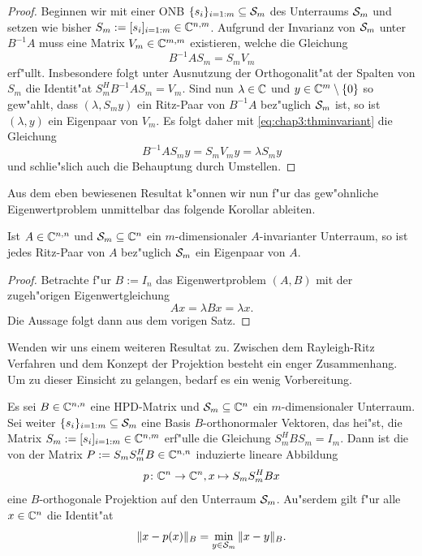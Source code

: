 \begin{proof}
Beginnen wir mit einer ONB $\{s_i\}_{i=1:m}\subseteq\S_m$ des Unterraums $\S_m$
und setzen wie bisher $S_m := [s_i]_{i=1:m}\in\C^{n,m}$. Aufgrund der Invarianz
von $\S_m$ unter $B^{-1}A$ muss eine Matrix $V_m \in \C^{m,m}$ existieren, welche
die Gleichung
\begin{equation}\label{eq:chap3:thminvariant}
B^{-1}A S_m = S_m V_m
\end{equation}
erf"ullt. Insbesondere folgt unter Ausnutzung der Orthogonalit"at der Spalten
von $S_m$ die Identit"at $S_m^H B^{-1}A S_m = V_m$.
Sind nun $\lambda\in\C$ und $y\in\C^m\setminus\{0\}$ so gew"ahlt, dass $(\lambda, S_m y)$
ein Ritz-Paar von $B^{-1}A$ bez"uglich $\S_m$ ist, so ist $(\lambda, y)$ ein Eigenpaar von $V_m$. Es folgt daher
mit \eqref{eq:chap3:thminvariant} die Gleichung
\[
B^{-1}AS_m y = S_m V_m y = \lambda S_m y
\]
und schlie"slich auch die Behauptung durch Umstellen.
\end{proof}

Aus dem eben bewiesenen Resultat k"onnen wir nun f"ur das gew"ohnliche Eigenwertproblem unmittelbar das folgende Korollar
ableiten.

\begin{kor}
Ist $A\in\Cnn$ und $\S_m\subseteq \Cn$ ein $m$-dimensionaler $A$-invarianter Unterraum, so ist
jedes Ritz-Paar von $A$ bez"uglich $\S_m$ ein Eigenpaar von $A$.
\end{kor}

\begin{proof}
Betrachte f"ur $B:=I_n$ das Eigenwertproblem $(A,B)$
mit der zugeh"origen Eigenwertgleichung
\[
Ax = \lambda Bx = \lambda x.
\]
Die Aussage folgt dann aus dem vorigen Satz.
\end{proof}

Wenden wir uns einem weiteren Resultat zu. Zwischen dem Rayleigh-Ritz Verfahren und dem Konzept der Projektion besteht ein enger Zusammenhang.
Um zu dieser Einsicht zu gelangen, bedarf es ein wenig
Vorbereitung.
\begin{thm}\label{thm:chap3:projektor}
Es sei $B\in\Cnn$ eine HPD-Matrix und $\S_m \subseteq \Cn$ ein $m$-dimensionaler Unterraum. Sei weiter $\{s_i\}_{i=1:m}\subseteq\S_m$ eine
Basis $B$-orthonormaler Vektoren, das hei"st, die Matrix $S_m := [s_i]_{i=1:m}
\in\C^{n,m}$ erf"ulle die Gleichung $S_m^H B S_m = I_m$. Dann ist die von der Matrix
 $P := S_m S_m^H B \in \Cnn$ induzierte lineare Abbildung
\[
p \colon \Cn \to \Cn, x\mapsto S_m S_m^H Bx
\]
eine $B$-orthogonale Projektion auf den Unterraum $\S_m$. Au"serdem gilt
f"ur alle $x\in\Cn$ die Identit"at
\[
\|x-p(x)\|_B = \min_{y\in\S_m} \|x - y\|_B.
\]
\end{thm}

